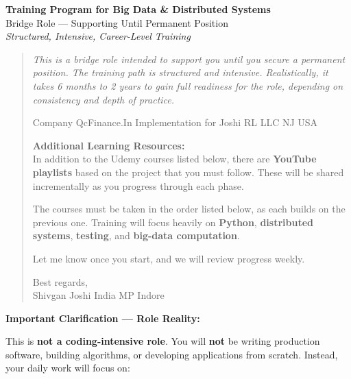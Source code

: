 \documentclass[12pt]{article}
\begin{document}
	
	\begin{center}
		{\Huge\bfseries Training Program for Big Data \& Distributed Systems} \\[0.5cm]
		{\large Bridge Role — Supporting Until Permanent Position} \\[0.3cm]
		{\textit{Structured, Intensive, Career-Level Training}} \\[1cm]
	\end{center}
	
	\begin{quote}
		\emph{This is a bridge role intended to support you until you secure a permanent position. 	
			The training path is structured and intensive. Realistically, it takes 6 months to 2 years to gain full readiness for the role, depending on consistency and depth of practice.}
		
		\vspace{0.3cm}
		

		
		Company QcFinance.In
		Implementation for Joshi RL LLC NJ USA
		
		\vspace{0.3cm}
		
		\textbf{Additional Learning Resources:} \\
		In addition to the Udemy courses listed below, there are \textbf{YouTube playlists} based on the project that you must follow. These will be shared incrementally as you progress through each phase.
		
		\vspace{0.3cm}
		
		The courses must be taken in the order listed below, as each builds on the previous one. Training will focus heavily on \textbf{Python}, \textbf{distributed systems}, \textbf{testing}, and \textbf{big-data computation}.
		
		Let me know once you start, and we will review progress weekly.
		
		Best regards, \\
		Shivgan Joshi India MP Indore
	\end{quote}
	
	
	\vspace{0.3cm}
	
	\textbf{Important Clarification — Role Reality:}
	
	This is \textbf{not a coding-intensive role}. You will \textbf{not} be writing production software, building algorithms, or developing applications from scratch. Instead, your daily work will focus on:
	
\end{document}

